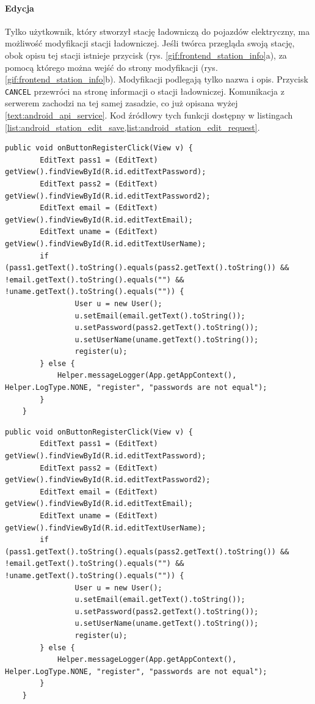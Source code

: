 \paragraph{Edycja\newline}
Tylko użytkownik, który stworzył stację ładowniczą do pojazdów elektryczny, ma możliwość modyfikacji stacji ładowniczej. Jeśli twórca przegląda swoją stację, obok opisu tej stacji istnieje przycisk (rys. \ref{gif:frontend_station_info}a), za pomocą którego można wejść do strony modyfikacji (rys. \ref{gif:frontend_station_info}b).
Modyfikacji podlegają tylko nazwa i opis. Przycisk \texttt{CANCEL} przewróci na stronę informacji o stacji ładowniczej. Komunikacja z serwerem zachodzi na tej samej zasadzie, co już opisana wyżej \ref{text:android_api_service}. Kod źródłowy tych funkcji dostępny w listingach \ref{list:android_station_edit_save,list:android_station_edit_request}.
\begin{lstlisting}[label=list:android_station_edit_save,caption=Przycisk SAVE,basicstyle=\tiny\ttfamily]
    public void onButtonRegisterClick(View v) {
        EditText pass1 = (EditText) getView().findViewById(R.id.editTextPassword);
        EditText pass2 = (EditText) getView().findViewById(R.id.editTextPassword2);
        EditText email = (EditText) getView().findViewById(R.id.editTextEmail);
        EditText uname = (EditText) getView().findViewById(R.id.editTextUserName);
        if (pass1.getText().toString().equals(pass2.getText().toString()) && !email.getText().toString().equals("") && !uname.getText().toString().equals("")) {
                User u = new User();
                u.setEmail(email.getText().toString());
                u.setPassword(pass2.getText().toString());
                u.setUserName(uname.getText().toString());
                register(u);
        } else {
            Helper.messageLogger(App.getAppContext(), Helper.LogType.NONE, "register", "passwords are not equal");
        }
    }
\end{lstlisting}
\begin{lstlisting}[label=list:android_station_edit_request,caption=Edycja stacji ładowniczej,basicstyle=\tiny\ttfamily]
    public void onButtonRegisterClick(View v) {
        EditText pass1 = (EditText) getView().findViewById(R.id.editTextPassword);
        EditText pass2 = (EditText) getView().findViewById(R.id.editTextPassword2);
        EditText email = (EditText) getView().findViewById(R.id.editTextEmail);
        EditText uname = (EditText) getView().findViewById(R.id.editTextUserName);
        if (pass1.getText().toString().equals(pass2.getText().toString()) && !email.getText().toString().equals("") && !uname.getText().toString().equals("")) {
                User u = new User();
                u.setEmail(email.getText().toString());
                u.setPassword(pass2.getText().toString());
                u.setUserName(uname.getText().toString());
                register(u);
        } else {
            Helper.messageLogger(App.getAppContext(), Helper.LogType.NONE, "register", "passwords are not equal");
        }
    }
\end{lstlisting}

